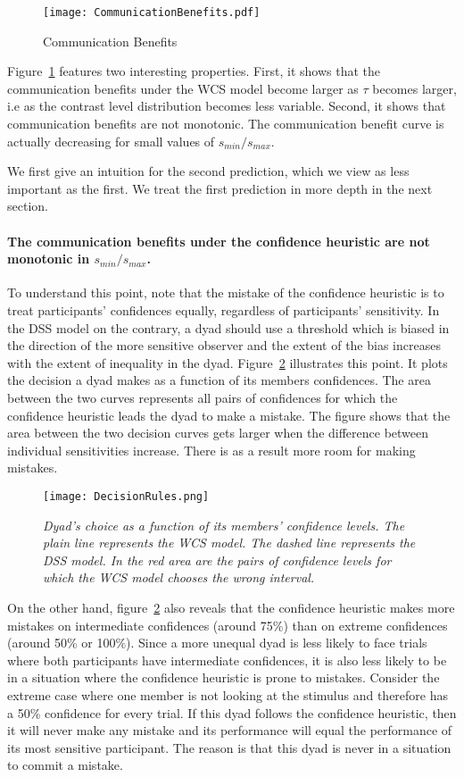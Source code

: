 \documentclass[12pt]{article}
\begin{document}
\begin{figure}[ht!] 
\centering
\texttt{[image: CommunicationBenefits.pdf]}
\caption{Communication Benefits}
\label{f3}
\end{figure}

Figure~\ref{f3} features two interesting properties. First, it shows that the communication benefits under the WCS model become larger as $\tau$ becomes larger, i.e as the contrast level distribution becomes less variable. Second, it shows that communication benefits are not monotonic. The communication benefit curve is actually decreasing for small values of $s_{min}/s_{max}$. 

We first give an intuition for the second prediction, which we view as less important as the first. We treat the first prediction in more depth in the next section. 

\paragraph*{The communication benefits under the confidence heuristic are not monotonic in $s_{min}/s_{max}$.} 

To understand this point, note that the mistake of the confidence heuristic is to treat participants' confidences equally, regardless of participants' sensitivity. In the DSS model on the contrary, a dyad should use a threshold which is biased in the direction of the more sensitive observer and the extent of the bias increases with the extent of inequality in the dyad. Figure~\ref{f2} illustrates this point. It plots the decision a dyad makes as a function of its members confidences. The area between the two curves represents all pairs of confidences for which the confidence heuristic leads the dyad to make a mistake. The figure shows that the area between the two decision curves gets larger when the difference between individual sensitivities increase. There is as a result more room for making mistakes. 
\begin{figure}[ht!] 
\centering
\texttt{[image: DecisionRules.png]}
\centering
\caption{\textit{Dyad's choice as a function of its members' confidence levels. The plain line represents the WCS model. The dashed line represents the DSS model. In the red area are the pairs of confidence levels for which the WCS model chooses the wrong interval.}}
\label{f2}
\end{figure}

On the other hand, figure~\ref{f2} also reveals that the confidence heuristic makes more mistakes on intermediate confidences (around 75\%) than on extreme confidences (around 50\% or 100\%). Since a more unequal dyad is less likely to face trials where both participants have intermediate confidences, it is also less likely to be in a situation where the confidence heuristic is prone to mistakes. Consider the extreme case where one member is not looking at the stimulus and therefore has a 50\% confidence for every trial. If this dyad follows the confidence heuristic, then it will never make any mistake and its performance will equal the performance of its most sensitive participant. The reason is that this dyad is never in a situation to commit a mistake. 
\end{document}
